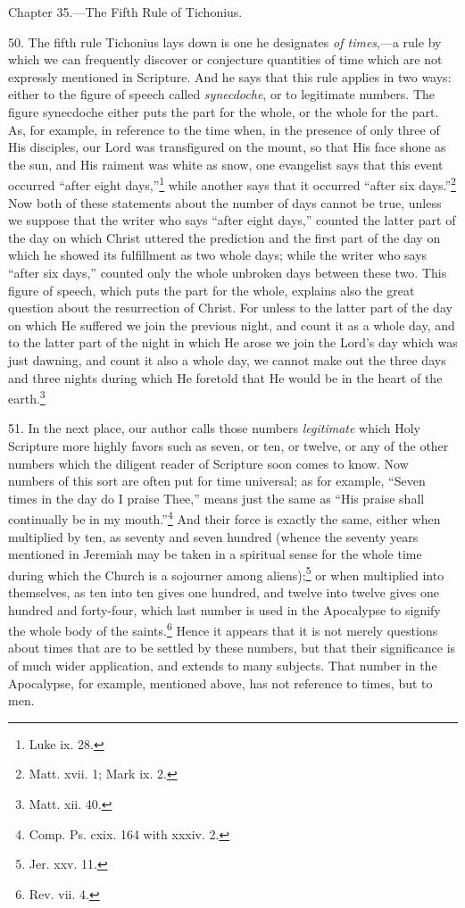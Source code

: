 
Chapter 35.—The Fifth Rule of Tichonius.

50. The fifth rule Tichonius lays down is one he designates \emph{of times},—a rule by which we can frequently discover or conjecture quantities of time which are not expressly mentioned in Scripture. And he says that this rule applies in two ways: either to the figure of speech called \emph{ synecdoche}, or to legitimate numbers. The figure synecdoche either puts the part for the whole, or the whole for the part. As, for example, in reference to the time when, in the presence of only three of His disciples, our Lord was transfigured on the mount, so that His face shone as the sun, and His raiment was white as snow, one evangelist says that this event occurred “after eight days,”\footnote{Luke ix. 28.} while another says that it occurred “after six days.”\footnote{Matt. xvii. 1; Mark ix. 2.} Now both of these statements about the number of days cannot be true, unless we suppose that the writer who says “after eight days,” counted the latter part of the day on which Christ uttered the prediction and the first part of the day on which he showed its fulfillment as two whole days; while the writer who says “after six days,” counted only the whole unbroken days between these two. This figure of speech, which puts the part for the whole, explains also the great question about the resurrection of Christ. For unless to the latter part of the day on which He suffered we join the previous night, and count it as a whole day, and to the latter part of the night in which He arose we join the Lord’s day which was just dawning, and count it also a whole day, we cannot make out the three days and three nights during which He foretold that He would be in the heart of the earth.\footnote{Matt. xii. 40.}

51. In the next place, our author calls those numbers \emph{legitimate} which Holy Scripture more highly favors such as seven, or ten, or twelve, or any of the other numbers which the diligent reader of Scripture soon comes to know. Now numbers of this sort are often put for time universal; as for example, “Seven times in the day do I praise Thee,” means just the same as “His praise shall continually be in my mouth.”\footnote{Comp. Ps. cxix. 164 with xxxiv. 2.} And their force is exactly the same, either when multiplied by ten, as seventy and seven hundred (whence the seventy years mentioned in Jeremiah may be taken in a spiritual sense for the whole time during which the Church is a sojourner among aliens);\footnote{Jer. xxv. 11.} or when multiplied into themselves, as ten into ten gives one hundred, and twelve into twelve gives one hundred and forty-four, which last number is  used in the Apocalypse to signify the whole body of the saints.\footnote{Rev. vii. 4.} Hence it appears that it is not merely questions about times that are to be settled by these numbers, but that their significance is of much wider application, and extends to many subjects. That number in the Apocalypse, for example, mentioned above, has not reference to times, but to men.

